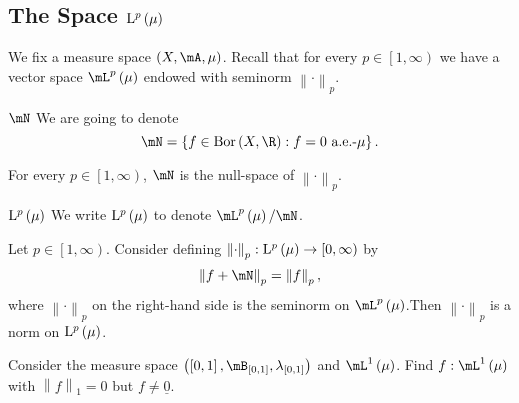 \documentclass[pmath450]{subfiles}
\begin{document}
    \subsection{The Space $\operatorname{L^{\text{$p$}}}\left( \mu \right)$}
    
    We fix a measure space $\left( X,\mA,\mu \right)$. Recall that for every $p\in\left[ 1,\infty \right)$ we have a vector space $\lp\left( \mu \right)$ endowed with seminorm $\left\lVert \cdot\right\rVert_p$.

    \begin{notation}{$\mN$}
        We are going to denote
        \begin{equation*}
            \mN = \left\lbrace f\in\bor\left( X,\R \right) : f=0\text{ a.e.-$\mu$} \right\rbrace.
        \end{equation*}
    \end{notation}

    \begin{prop}{}
        For every $p\in\left[ 1,\infty \right)$, $\mN$ is the null-space of $\left\lVert \cdot\right\rVert_p$.
    \end{prop}

    \rruleline

    \begin{notation}{$\operatorname{L^{\text{$p$}}}\left( \mu \right)$}
        We write $\operatorname{L^{\text{$p$}}}\left( \mu \right)$ to denote $\lp\left( \mu \right) /\mN$.
    \end{notation}

    \begin{prop}{}
        Let $p\in\left[ 1,\infty \right)$. Consider defining $\left\lVert \cdot\right\rVert_p:\operatorname{L^{\text{$p$}}}\left( \mu \right)\to\left[ 0,\infty \right)$ by
        \begin{equation*}
            \left\lVert f+\mN\right\rVert_p = \left\lVert f\right\rVert_p,
        \end{equation*}
        where $\left\lVert \cdot\right\rVert_p$ on the right-hand side is the seminorm on $\lp\left( \mu \right)$.\footnotemark[1] Then $\left\lVert \cdot\right\rVert_p$ is a norm on $\operatorname{L^{\text{$p$}}}\left( \mu \right)$.
        
        \noindent
        \begin{minipage}{\textwidth}
        \end{minipage}
    \end{prop}
    
    \begin{exercise}{}
        Consider the measure space $\left( \left[ 0,1 \right],\mB_{\left[ 0,1 \right]},\lambda_{\left[ 0,1 \right]} \right)$ and $\lone\left( \mu \right)$. Find $f:\lone\left( \mu \right)$ with $\left\lVert f \right\rVert_{1}=0$ but $f\neq\underline{0}$.
    \end{exercise}
\end{document}

